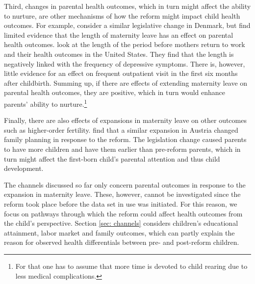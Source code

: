 \documentclass[a4paper ]{article}
\begin{document}
Third, changes in parental health outcomes, which in turn might affect the ability to nurture, are other mechanisms of how the reform might impact child health outcomes. For example, \cite{beuchert2014length} consider a similar legislative change in Denmark, but find limited evidence that the length of maternity leave has an effect on parental health outcomes. \cite{chatterji2005does} look at the length of the period before mothers return to work and their health outcomes in the United States. They find that the length is negatively linked with the frequency of depressive symptoms. There is, however, little evidence for an effect on frequent outpatient visit in the first six months after childbirth. \newline
Summing up, if there are effects of extending maternity leave on parental health outcomes, they are positive, which in turn would enhance parents' ability to nurture.\footnote{ For that one has to assume that more time is devoted to child rearing due to less medical complications.}\newline 







Finally, there are also effects of expansions in maternity leave on other outcomes such as higher-order fertility. \cite{lalive2009does} find that a similar expansion in Austria changed family planning in response to the reform. The legislation change caused parents to have more children and have them earlier than pre-reform parents, which in turn might affect the first-born child's parental attention and thus child development.\newline 


The channels discussed so far only concern parental outcomes in response to the expansion in maternity leave. These, however, cannot be investigated since the reform took place before the data set in use was initiated. For this reason, we focus on pathways through which the reform could affect health outcomes from the child's perspective.  Section \ref{sec: channels} considers children's educational attainment, labor market and family outcomes, which can partly explain the reason for observed health differentials between pre- and post-reform children. 




\end{document}
